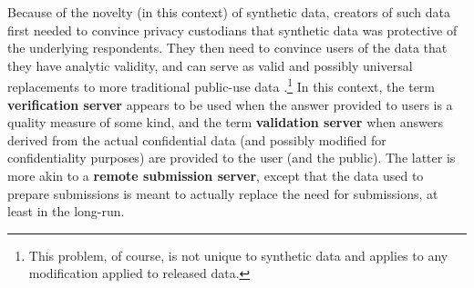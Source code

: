 \documentclass[]{hdsr}
\begin{document}
Because of the novelty (in this context) of synthetic data, creators of such data first needed to convince privacy custodians that synthetic data was protective of the underlying respondents. They then need to convince users of the data that they have analytic validity, and can serve as valid and possibly universal replacements to more traditional public-use data \citep{reiter_verification_2009}.\footnote{This problem, of course, is not unique to synthetic data and applies to any modification applied to released data.} In this context, the term \textbf{verification server} appears to be used  when the answer provided to users is a quality measure of some kind, and the term \textbf{validation server} when answers derived from the actual confidential data (and possibly modified for confidentiality purposes) are provided to the user (and the public). The latter is more akin to a \textbf{remote submission server}, except that the data used to prepare submissions is meant to actually replace the need for submissions, at least in the long-run.  
\end{document}
